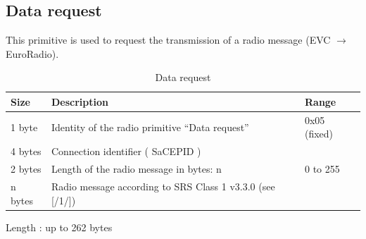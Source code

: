 \documentclass[nocc]{template/openetcs_report}
\begin{document}
\subsection{Data request}
This primitive is used to request the transmission of a radio message (EVC $\rightarrow$ EuroRadio).
 			\begin{longtable}{|l|l|l|}
				\caption{Data request}\\ 
				\hline
				
					\begin{minipage}[t]{0.1\linewidth} \textbf{Size}	\end{minipage}
				&	\begin{minipage}[t]{0.5\linewidth} \textbf{Description}	\end{minipage}
				&	\begin{minipage}[t]{0.3\linewidth} \textbf{Range} \end{minipage} \\
				
				\hline
					 \begin{minipage}[t]{0.1\linewidth}1 byte \end{minipage}
					&\begin{minipage}[t]{0.6\linewidth}Identity of the radio primitive "`Data request"'	\end{minipage}
					&\begin{minipage}[t]{0.3\linewidth}0x05 (fixed) \end{minipage} \\
					
				\hline
					 \begin{minipage}[t]{0.1\linewidth}4 bytes \end{minipage}
					&\begin{minipage}[t]{0.6\linewidth}Connection identifier ( SaCEPID )	\end{minipage}
					&\begin{minipage}[t]{0.3\linewidth} \end{minipage} \\
					
				\hline
					 \begin{minipage}[t]{0.1\linewidth}2 bytes \end{minipage}
					&\begin{minipage}[t]{0.6\linewidth}Length of the radio message in bytes: n	\end{minipage}
					&\begin{minipage}[t]{0.3\linewidth}0 to 255 \end{minipage} \\
					
				\hline
					 \begin{minipage}[t]{0.1\linewidth}n bytes \end{minipage}
					&\begin{minipage}[t]{0.6\linewidth}Radio message according to SRS Class 1 v3.3.0 (see [/1/])	\end{minipage}
					&\begin{minipage}[t]{0.3\linewidth}\end{minipage} \\
					
				\hline	
			\end{longtable}
			Length : up to 262 bytes	
\end{document}
